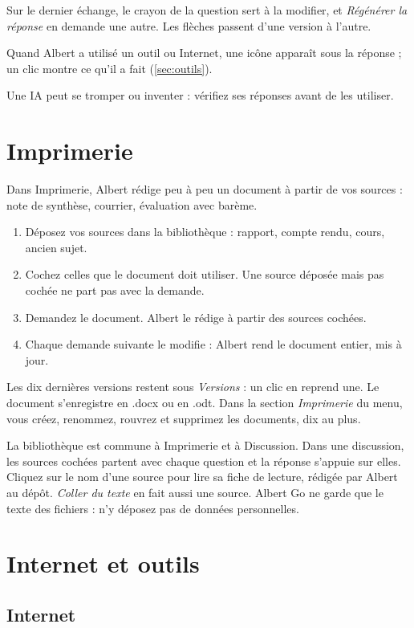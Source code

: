 \documentclass[a4paper, 11pt]{article}
\begin{document}
Sur le dernier échange, le crayon de la question sert à la modifier, et \emph{Régénérer la réponse} en demande une autre. Les flèches passent d'une version à l'autre.

Quand Albert a utilisé un outil ou Internet, une icône apparaît sous la réponse ; un clic montre ce qu'il a fait (\autoref{sec:outils}).

Une IA peut se tromper ou inventer : vérifiez ses réponses avant de les utiliser.

\section{Imprimerie}
\label{sec:imprimerie}

Dans Imprimerie, Albert rédige peu à peu un document à partir de vos sources : note de synthèse, courrier, évaluation avec barème.
\begin{enumerate}
  \item Déposez vos sources dans la bibliothèque : rapport, compte rendu, cours, ancien sujet.
  \item Cochez celles que le document doit utiliser. Une source déposée mais pas cochée ne part pas avec la demande.
  \item Demandez le document. Albert le rédige à partir des sources cochées.
  \item Chaque demande suivante le modifie : Albert rend le document entier, mis à jour.
\end{enumerate}

Les dix dernières versions restent sous \emph{Versions} : un clic en reprend une. Le document s'enregistre en .docx ou en .odt. Dans la section \emph{Imprimerie} du menu, vous créez, renommez, rouvrez et supprimez les documents, dix au plus.

La bibliothèque est commune à Imprimerie et à Discussion. Dans une discussion, les sources cochées partent avec chaque question et la réponse s'appuie sur elles. Cliquez sur le nom d'une source pour lire sa fiche de lecture, rédigée par Albert au dépôt. \emph{Coller du texte} en fait aussi une source. Albert Go ne garde que le texte des fichiers : n'y déposez pas de données personnelles.

\section{Internet et outils}
\label{sec:outils}

\subsection{Internet}
\end{document}
